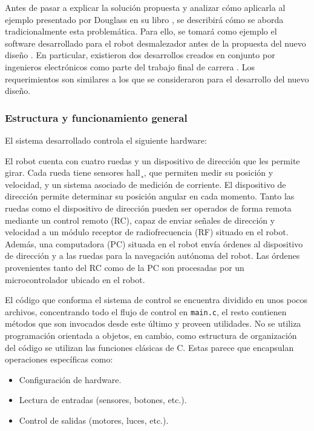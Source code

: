Antes de pasar a explicar la solución propuesta y analizar cómo aplicarla al ejemplo presentado por Douglass en su libro \cite{douglass}, se describirá cómo se aborda tradicionalmente esta problemática. Para ello, se tomará como ejemplo el software desarrollado para el robot desmalezador antes de la propuesta del nuevo diseño \cite{paperPomponio}. En particular, existieron dos desarrollos creados en conjunto por ingenieros electrónicos como parte del trabajo final de carrera \cite{disenioViejo1, disenioViejo2}. Los requerimientos son similares a los que se consideraron para el desarrollo del nuevo diseño.

\subsubsection*{Estructura y funcionamiento general}

El sistema desarrollado controla el siguiente hardware:

El robot cuenta con cuatro ruedas y un dispositivo de dirección que les permite girar. Cada rueda tiene sensores \gls{hall}¸, que permiten medir su posición y velocidad, y un sistema asociado de medición de corriente. El dispositivo de dirección permite determinar su posición angular en cada momento. Tanto las ruedas como el dispositivo de dirección pueden ser operados de forma remota mediante un control remoto (RC), capaz de enviar señales de dirección y velocidad a un módulo receptor de radiofrecuencia (RF) situado en el robot. Además, una computadora (PC) situada en el robot envía órdenes al dispositivo de dirección y a las ruedas para la navegación autónoma del robot. Las órdenes provenientes tanto del RC como de la PC son procesadas por un microcontrolador ubicado en el robot.

El código que conforma el sistema de control se encuentra dividido en unos pocos archivos, concentrando todo el flujo de control en \verb|main.c|, el resto contienen métodos que son invocados desde este último y proveen utilidades. No se utiliza programación orientada a objetos, en cambio, como estructura de organización del código se utilizan las funciones clásicas de C. Estas parece que encapsulan operaciones específicas como:
\begin{itemize}
\item Configuración de hardware.
\item Lectura de entradas (sensores, botones, etc.).
\item Control de salidas (motores, luces, etc.).
\end{itemize}

